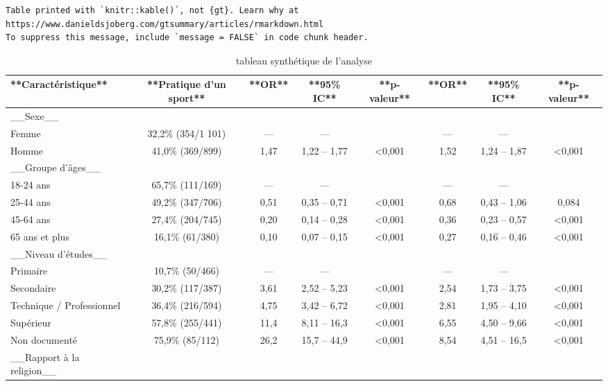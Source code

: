 \documentclass[
  letterpaper,
  DIV=11,
  numbers=noendperiod,
  oneside]{scrreprt}
\begin{document}
\begin{verbatim}
Table printed with `knitr::kable()`, not {gt}. Learn why at
https://www.danieldsjoberg.com/gtsummary/articles/rmarkdown.html
To suppress this message, include `message = FALSE` in code chunk header.
\end{verbatim}

\hypertarget{tbl-merge-regression-logistique}{}
\begin{table}
\caption{\label{tbl-merge-regression-logistique}tableau synthétique de l'analyse }\tabularnewline

\centering
\begin{tabular}{l|c|c|c|c|c|c|c}
\hline
**Caractéristique** & **Pratique d'un sport** & **OR** & **95\% IC** & **p-valeur** & **OR** & **95\% IC** & **p-valeur**\\
\hline
\_\_Sexe\_\_ &  &  &  &  &  &  & \\
\hline
Femme & 32,2\% (354/1 101) & — & — &  & — & — & \\
\hline
Homme & 41,0\% (369/899) & 1,47 & 1,22 – 1,77 & <0,001 & 1,52 & 1,24 – 1,87 & <0,001\\
\hline
\_\_Groupe d'âges\_\_ &  &  &  &  &  &  & \\
\hline
18-24 ans & 65,7\% (111/169) & — & — &  & — & — & \\
\hline
25-44 ans & 49,2\% (347/706) & 0,51 & 0,35 – 0,71 & <0,001 & 0,68 & 0,43 – 1,06 & 0,084\\
\hline
45-64 ans & 27,4\% (204/745) & 0,20 & 0,14 – 0,28 & <0,001 & 0,36 & 0,23 – 0,57 & <0,001\\
\hline
65 ans et plus & 16,1\% (61/380) & 0,10 & 0,07 – 0,15 & <0,001 & 0,27 & 0,16 – 0,46 & <0,001\\
\hline
\_\_Niveau d'études\_\_ &  &  &  &  &  &  & \\
\hline
Primaire & 10,7\% (50/466) & — & — &  & — & — & \\
\hline
Secondaire & 30,2\% (117/387) & 3,61 & 2,52 – 5,23 & <0,001 & 2,54 & 1,73 – 3,75 & <0,001\\
\hline
Technique / Professionnel & 36,4\% (216/594) & 4,75 & 3,42 – 6,72 & <0,001 & 2,81 & 1,95 – 4,10 & <0,001\\
\hline
Supérieur & 57,8\% (255/441) & 11,4 & 8,11 – 16,3 & <0,001 & 6,55 & 4,50 – 9,66 & <0,001\\
\hline
Non documenté & 75,9\% (85/112) & 26,2 & 15,7 – 44,9 & <0,001 & 8,54 & 4,51 – 16,5 & <0,001\\
\hline
\_\_Rapport à la religion\_\_ &  &  &  &  &  &  & \\

\end{tabular}
\end{table}
\end{document}
